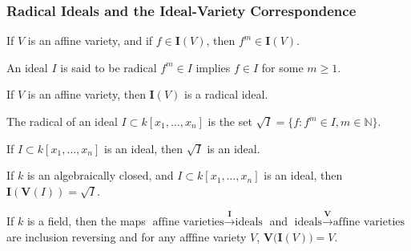             \subsubsection{Radical Ideals and the Ideal-Variety Correspondence}
                \begin{theorem}
                    If $V$ is an affine variety, and if
                    $f\in \textbf{I}(V)$, then $f^m\in \textbf{I}(V)$.
                \end{theorem}
                \begin{definition}
                    An ideal $I$ is said to be radical $f^m \in I$
                    implies $f\in I$ for some $m\geq 1$.
                \end{definition}
                \begin{theorem}
                    If $V$ is an affine variety,
                    then $\textbf{I}(V)$ is a radical ideal.
                \end{theorem}
                \begin{definition}
                    The radical of an ideal
                    $I\subset k[x_{1},\hdots,x_{n}]$ is the set
                    $\sqrt{I}=\{f:f^{m}\in I,m\in\mathbb{N}\}$.
                \end{definition}
                \begin{theorem}
                    If $I\subset k[x_1,\hdots ,x_n]$ is an ideal,
                    then $\sqrt{I}$ is an ideal.
                \end{theorem}
                \begin{theorem}
                    If $k$ is an algebraically closed,
                    and $I\subset k[x_1,\hdots ,x_n]$ is an ideal,
                    then $\textbf{I}(\mathbf{V}(I))=\sqrt{I}$.
                \end{theorem}
                \begin{theorem}
                    If $k$ is a field, then the maps
                    $\textrm{affine varieties}%
                     \overset{\textbf{I}}\rightarrow\textrm{ideals}$
                    and
                    $\textrm{ideals}%
                     \overset{\mathbf{V}}\rightarrow\textrm{affine varieties}$
                    are inclusion reversing and for any
                    afffine variety $V$,
                    $\mathbf{V}\big(\textbf{I}(V)\big)=V$.
                \end{theorem}
